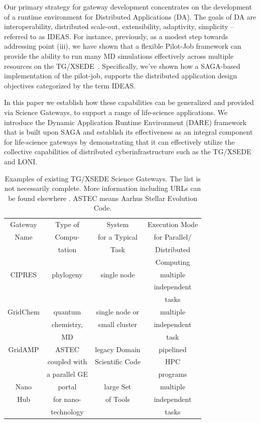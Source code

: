 \documentclass[]{svjour3}
\begin{document}
Our primary strategy for gateway development concentrates on the development of a runtime environment for Distributed Applications (DA). The goals of DA are interoperability, distributed scale-out,
extensibility, adaptivity, simplicity -- referred to as
IDEAS\cite{ideas}. For instance, previously, as a modest step towards addressing point (iii),
we have shown that a flexible Pilot-Job framework can provide the
ability to run many MD simulations effectively across multiple
resources on the TG/XSEDE~\cite{saga-royalsoc, saga-ccgrid10}. 
Specifically, we've shown how a SAGA-based implementation of the
pilot-job, supports the distributed application design objectives
categorized by the term IDEAS\cite{ideas}. 

In this paper we establish how these capabilities can be generalized
and provided via Science Gateways, to support a range of life-science
applications. We introduce the Dynamic Application Runtime Environment (DARE) framework that is built upon SAGA and establish its effectiveness as an integral component for life-science gateways by demonstrating that it can
effectively utilize the collective capabilities of distributed cyberinfrastructure such as the TG/XSEDE and LONI.

\begin{table}
\centering
 \small
\begin{tabular}{|c|c|c|c|} 
  \hline Gateway  & Type of & System  & Execution Mode 
  \\
  Name & Compu- & for a Typical & for Parallel/ \\ 
  &  tation & Task & Distributed \\
  & & & Computing \\  \hline \hline 
  
  CIPRES   & phylogeny  &  single node  & multiple  \\
   &  &   & independent   \\ 
  &  &  &  tasks \\  \hline
  GridChem   & quantum & single node or     & multiple  \\
     & chemistry, & small cluster & independent   \\
  & MD &  & task  \\ \hline
   GridAMP     & ASTEC  & legacy Domain  & pipelined \\ 
  & coupled with  &  Scientific Code   & HPC  \\
  & a parallel GE &   &  programs \\ \hline
  Nano  & portal  & large Set   & multiple \\
  Hub  & for nano- & of Tools  & independent \\
   & technology &  & tasks \\ \hline
  \hline
\end{tabular} \caption{Examples of existing TG/XSEDE Science Gateways. The list is not necessarily complete. More information including URLs can be found elsewhere \cite{tg-sg-list-url}. ASTEC means Aarhus Stellar Evolution Code.}
 \label{table:TG-sg} 
\end{table}
\end{document}
